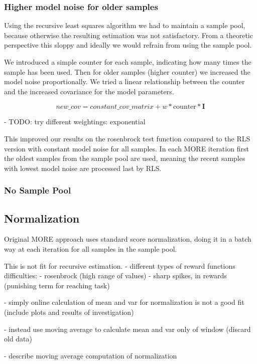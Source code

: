 \subsubsection{Higher model noise for older samples}
Using the recursive least squares algorithm we had to maintain a sample
pool, because otherwise the resulting estimation was not
satisfactory. From a theoretic perspective this sloppy and ideally we
would refrain from using the sample pool.

We introduced a simple counter for each sample, indicating how many times
the sample has been used.
Then for older samples (higher counter) we increased the model
noise proportionally.
We tried a linear relationship between the counter and
the increased covariance for the model parameters.

$$ new\_cov = constant\_cov\_matrix + w * \text{counter} * \mathbf{I} $$

- TODO: try different weightings: exponential

This improved our results on the rosenbrock test function compared
to the RLS version with constant model noise for all samples.
In each MORE iteration first the oldest samples from the sample pool
are used, meaning the recent samples with lowest model noise are
processed last by RLS.

\subsubsection{No Sample Pool}


\subsection{Normalization}
Original MORE approach uses standard score normalization, doing it
in a batch way at each iteration for all samples in the sample pool.

This is not fit for recursive estimation.
- different types of reward functions difficulties:
- rosenbrock (high range of values)
- sharp spikes, in rewards (punishing term for reaching task)

- simply online calculation of mean and var for normalization is not
a good fit (include plots and results of investigation)

- instead use moving average to calculate mean and var only of window (discard old
  data) 

- describe moving average computation of normalization

